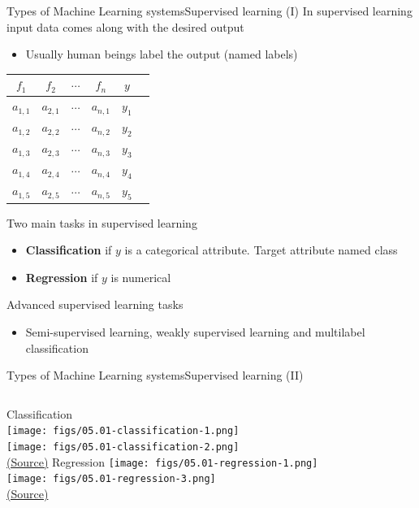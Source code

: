 \documentclass[10pt,compress]{beamer} %
\begin{document}
\begin{frame}[fragile]{Types of Machine Learning systems}{Supervised learning (I)}
	In supervised learning input data comes along with the desired output
	\begin{itemize}
		\item Usually human beings label the output (named \alert{labels})
	\end{itemize}

	\begin{center}
	\begin{tabular}{cccccc}\hline
	 	$f_1$     & $f_2$     & $\cdots$ & $f_n$     & $y$\\\hline
	 	$a_{1,1}$ & $a_{2,1}$ & $\cdots$ & $a_{n,1}$ & $y_1$ \\
	 	$a_{1,2}$ & $a_{2,2}$ & $\cdots$ & $a_{n,2}$ & $y_2$ \\
	 	$a_{1,3}$ & $a_{2,3}$ & $\cdots$ & $a_{n,3}$ & $y_3$ \\
	 	$a_{1,4}$ & $a_{2,4}$ & $\cdots$ & $a_{n,4}$ & $y_4$ \\
	 	$a_{1,5}$ & $a_{2,5}$ & $\cdots$ & $a_{n,5}$ & $y_5$ \\
	 	\hline
	\end{tabular}
	\end{center}

	 Two main tasks in supervised learning
	 \begin{itemize}
	 	\item \textbf{Classification} if $y$ is a categorical attribute. Target attribute named \alert{class}
		\item \textbf{Regression} if $y$ is numerical 
	 \end{itemize}
	 Advanced supervised learning tasks
	\begin{itemize}
	 	\item Semi-supervised learning, weakly supervised learning and multilabel classification
	 \end{itemize}

\end{frame}

\begin{frame}{Types of Machine Learning systems}{Supervised learning (II)}
	\vspace{-0.25cm}
	\begin{columns}
	   \centering Classification\\
			\texttt{[image: figs/05.01-classification-1.png]}\\
			\texttt{[image: figs/05.01-classification-2.png]}\\
    		\tiny{\href{https://jakevdp.github.io/PythonDataScienceHandbook/05.01-what-is-machine-learning.html}{(Source)}}
	   \centering Regression
			\texttt{[image: figs/05.01-regression-1.png]}\\
			\texttt{[image: figs/05.01-regression-3.png]}\\
    		\tiny{\href{https://jakevdp.github.io/PythonDataScienceHandbook/05.01-what-is-machine-learning.html}{(Source)}}
	\end{columns}
\end{frame}
\end{document}
